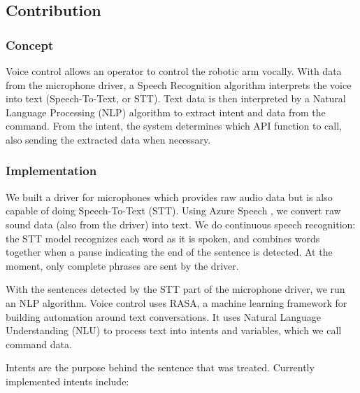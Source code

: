 


\subsection{Contribution}

\subsubsection{Concept}

Voice control allows an operator to control the robotic arm vocally. With data from the microphone driver, a Speech Recognition algorithm interprets the voice into text (Speech-To-Text, or STT). Text data is then interpreted by a Natural Language Processing (NLP) algorithm to extract intent and data from the command. From the intent, the system determines which API function to call, also sending the extracted data when necessary.

\subsubsection{Implementation}

We built a driver for microphones which provides raw audio data but is also capable of doing Speech-To-Text (STT). Using Azure Speech \cite{azure_speech}, we convert raw sound data (also from the driver) into text. We do continuous speech recognition: the STT model recognizes each word as it is spoken, and combines words together when a pause indicating the end of the sentence is detected. At the moment, only complete phrases are sent by the driver.

With the sentences detected by the STT part of the microphone driver, we run an NLP algorithm. Voice control uses RASA\cite{rasa}, a machine learning framework for building automation around text conversations. It uses Natural Language Understanding (NLU) to process text into intents and variables, which we call command data.

Intents are the purpose behind the sentence that was treated. Currently implemented intents include:


